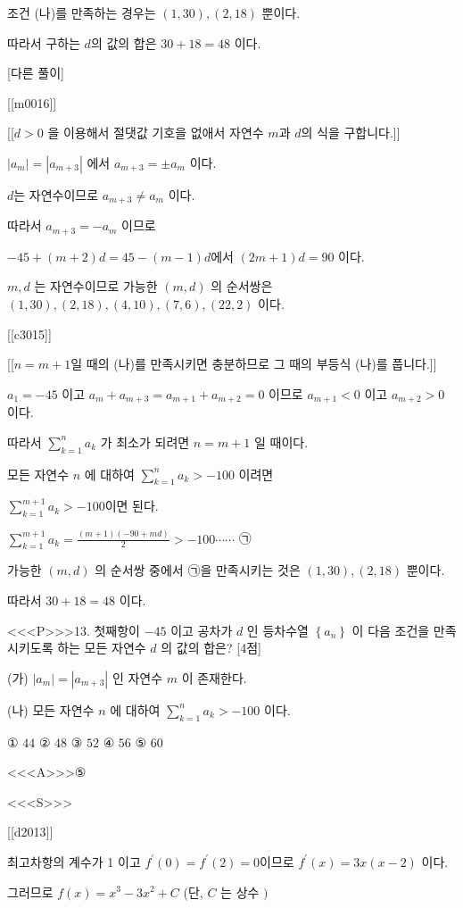 \documentclass{oblivoir}
\begin{document}
조건 (나)를 만족하는 경우는  $(1,30),(2,18)$ 뿐이다.

따라서 구하는 $d$의 값의 합은 $30+18=48$ 이다.

[다른 풀이]

[[m0016]]

[[$d > 0$ 을 이용해서 절댓값 기호을 없애서 자연수 $m$과 $d$의 식을 구합니다.]]

$\left|a_{m}\right|=\left|a_{m+3}\right|$ 에서 $a_{m+3}=\pm a_{m}$ 이다.

$d$는 자연수이므로 $a_{m+3} \neq a_{m}$ 이다.

따라서 $a_{m+3}=-a_{m}$ 이므로

$-45+(m+2) d=45-(m-1) d$에서 $(2 m+1) d=90 $ 이다.

$m, d$ 는 자연수이므로 가능한 $(m, d)$ 의 순서쌍은 $(1,30),(2,18),(4,10),(7,6),(22,2)$ 이다.

[[c3015]]

[[$n=m+1$일 때의 (나)를 만족시키면 충분하므로 그 때의 부등식 (나)를 풉니다.]]

$a_{1}=-45$ 이고 $a_{m}+a_{m+3}=a_{m+1}+a_{m+2}=0$ 이므로 $a_{m+1}<0$ 이고 $a_{m+2}>0$ 이다.

따라서 $\sum_{k=1}^{n} a_{k}$ 가 최소가 되려면 $n=m+1$ 일 때이다.

모든 자연수 $n$ 에 대하여 $\sum_{k=1}^{n} a_{k}>-100$ 이려면

$\sum_{k=1}^{m+1} a_{k}>-100 $이면 된다.

$\sum_{k=1}^{m+1} a_{k}=\frac{(m+1)(-90+m d)}{2}>-100 \cdots \cdots $ ㉠

가능한 $(m, d)$ 의 순서쌍 중에서  ㉠을 만족시키는 것은 $(1,30),(2,18)$ 뿐이다.

따라서 $30+18=48$ 이다.

<<<P>>>13. 첫째항이 $-45$ 이고 공차가 $d$ 인 등차수열 $\left\{a_{n}\right\}$ 이 다음 조건을 만족시키도록 하는 모든 자연수 $d$ 의 값의 합은? [4점]

(가) $\left|a_{m}\right|=\left|a_{m+3}\right|$ 인 자연수 $m$ 이 존재한다.

(나) 모든 자연수 $n$ 에 대하여 $\sum_{k=1}^{n} a_{k}>-100$ 이다.

① $44$
② $48$
③ $52$
④ $56$
⑤ $60$

<<<A>>>⑤

<<<S>>>

[[d2013]]

최고차항의 계수가 1 이고 $f^{\prime}(0)=f^{\prime}(2)=0$이므로 $f^{\prime}(x)=3 x(x-2)$ 이다.

그러므로 $f(x)=x^{3}-3 x^{2}+C$ (단, $C$ 는 상수 $)$
\end{document}
